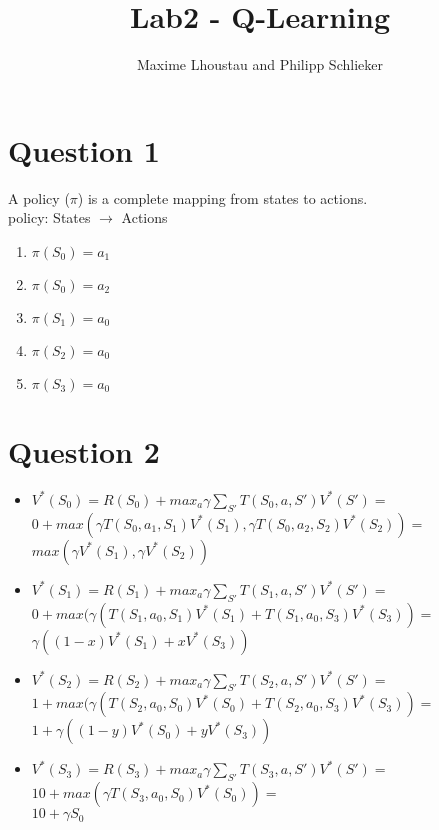 \documentclass[12pt]{article}
\begin{document}
\title{Lab2 - Q-Learning}
\author{Maxime Lhoustau and Philipp Schlieker}
\maketitle


\section*{Question 1}
A policy ($\pi$) is a complete mapping from states to actions.\\
policy: States $\rightarrow$ Actions 
\begin{enumerate}
\item $\pi(S_0) = a_1$
\item $\pi(S_0) = a_2$
\item $\pi(S_1) = a_0$
\item $\pi(S_2) = a_0$
\item $\pi(S_3) = a_0$ 
\end{enumerate}
\section*{Question 2}
\begin{itemize}
\item $V^{*}(S_0) = R(S_0)+max_a \gamma \sum_{S'}T(S_0,a,S')V^{*}(S') =$\\$0 + max(\gamma T(S_0, a_1, S_1)V^{*}(S_1), \gamma T(S_0, a_2, S_2)V^{*}(S_2)) =$\\$ max(\gamma V^{*}(S_1), \gamma V^{*}(S_2))$
\item $V^{*}(S_1) = R(S_1)+max_a \gamma \sum_{S'}T(S_1,a,S')V^{*}(S') =$\\
$0 + max(\gamma (T(S_1, a_0, S_1)V^{*}(S_1) + T(S_1, a_0, S_3)V^{*}(S_3)) =$\\
$\gamma ((1-x)V^{*}(S_1) + xV^{*}(S_3))$
\item $V^{*}(S_2) = R(S_2)+max_a \gamma \sum_{S'}T(S_2,a,S')V^{*}(S') =$\\
$1 + max(\gamma (T(S_2, a_0, S_0)V^{*}(S_0) + T(S_2, a_0, S_3)V^{*}(S_3)) =$\\
$1 + \gamma ((1-y)V^{*}(S_0) + yV^{*}(S_3))$
\item $V^{*}(S_3) = R(S_3)+max_a \gamma \sum_{S'}T(S_3,a,S')V^{*}(S') =$\\
$10 + max(\gamma T(S_3, a_0, S_0)V^{*}(S_0)) =$\\
$10 + \gamma S_0$
\end{itemize}
\end{document}
